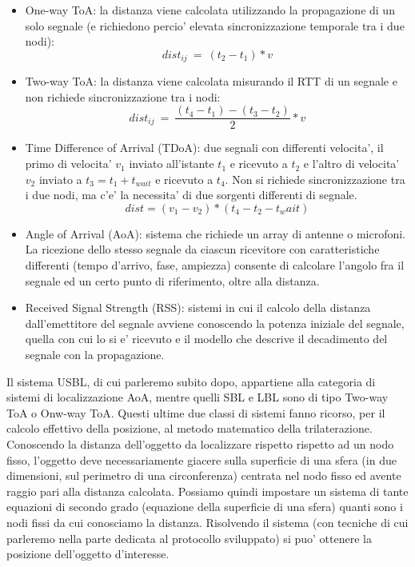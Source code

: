 \begin{itemize}
    \item One-way ToA: la distanza viene calcolata utilizzando la propagazione di un solo segnale (e richiedono percio' elevata sincronizzazione temporale tra i due nodi):
    \[dist_{ij}\ =\ (t_2-t_1)*v\]
    \item Two-way ToA: la distanza viene calcolata misurando il RTT di un segnale e non richiede sincronizzazione tra i nodi:
    \[dist_{ij}\ =\ \frac{(t_4-t_1)-(t_3-t_2)}{2}*v\]
    \item Time Difference of Arrival (TDoA): due segnali con differenti velocita', il primo di velocita' $v_1$ inviato all'istante $t_1$ e ricevuto a $t_2$ e l'altro di velocita' $v_2$ inviato a $t_3 = t_1 + t_{wait}$ e ricevuto a $t_4$. Non si richiede sincronizzazione tra i due nodi, ma c'e' la necessita' di due sorgenti differenti di segnale.
    \[dist = (v_1 - v_2)*(t_4 - t_2 - t_wait)\]
    \item Angle of Arrival (AoA): sistema che richiede un array di antenne o microfoni. La ricezione dello stesso segnale da ciascun ricevitore con caratteristiche differenti (tempo d'arrivo, fase, ampiezza) consente di calcolare l'angolo fra il segnale ed un certo punto di riferimento, oltre alla distanza.
    \item Received Signal Strength (RSS): sistemi in cui il calcolo della distanza dall'emettitore del segnale avviene conoscendo la potenza iniziale del segnale, quella con cui lo si e' ricevuto e il modello che descrive il decadimento del segnale con la propagazione.
\end{itemize}
Il sistema USBL, di cui parleremo subito dopo, appartiene alla categoria di sistemi di localizzazione AoA, mentre quelli SBL e LBL sono di tipo Two-way ToA o Onw-way ToA.
Questi ultime due classi di sistemi fanno ricorso, per il calcolo effettivo della posizione, al metodo matematico della trilaterazione.
Conoscendo la distanza dell'oggetto da localizzare rispetto rispetto ad un nodo fisso, l'oggetto deve necessariamente giacere sulla superficie di una sfera (in due dimensioni, sul perimetro di una circonferenza) centrata nel nodo fisso ed avente raggio pari alla distanza calcolata. Possiamo quindi impostare un sistema di tante equazioni di secondo grado (equazione della superficie di una sfera) quanti sono i nodi fissi da cui conosciamo la distanza. Risolvendo il sistema (con tecniche di cui parleremo nella parte dedicata al protocollo sviluppato) si puo' ottenere la posizione dell'oggetto d'interesse.

